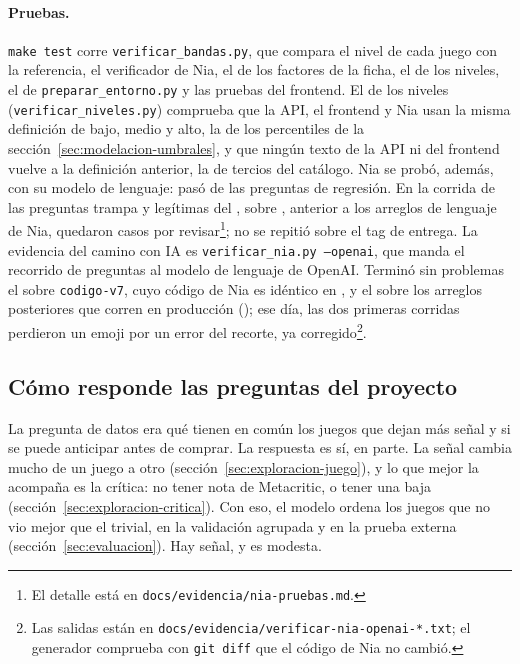 \paragraph{Pruebas.} \texttt{make test} corre \texttt{verificar\_bandas.py}, que compara el nivel de
cada juego con la referencia, el verificador de Nia, el de los factores de la ficha, el de los
niveles, el de \texttt{preparar\_entorno.py} y las pruebas del
frontend. El de los niveles (\texttt{verificar\_niveles.py}) comprueba que la API, el frontend y
Nia usan la misma definición de bajo, medio y alto, la de los percentiles de la
sección~\ref{sec:modelacion-umbrales}, y que ningún texto de la API ni del frontend vuelve a la
definición anterior, la de tercios del catálogo. Nia se probó, además, con su modelo de lenguaje:
pasó \cifraPreguntasNiaAprobadas{} de las \cifraPreguntasNia{} preguntas de regresión. En la corrida
de las \cifraPreguntasTrampa{} preguntas trampa y legítimas del \cifraFechaCorridaTrampas{}, sobre
\texttt{\cifraCommitTrampas}, anterior a los arreglos de lenguaje de Nia, quedaron
\cifraTrampasPorRevisar{} casos por revisar\footnote{El detalle está en
\texttt{docs/evidencia/nia-pruebas.md}.}; no se repitió sobre el tag de entrega. La evidencia del camino con IA
es \texttt{verificar\_nia.py --openai}, que manda el recorrido de preguntas al modelo de lenguaje de
OpenAI. Terminó sin problemas el \cifraFechaCorridaNiaIA{} sobre \mbox{\texttt{codigo-v7}}, cuyo código de
Nia es idéntico en \mbox{\texttt{\cifraTagCodigo}}, y el \cifraFechaCorridaNiaProduccion{} sobre los arreglos
posteriores que corren en producción (\texttt{\cifraCommitNiaProduccion}); ese día, las dos primeras
corridas perdieron un emoji por un error del recorte, ya corregido\footnote{Las salidas están en
\texttt{docs/evidencia/verificar-nia-openai-*.txt}; el generador comprueba con \texttt{git diff} que el
código de Nia no cambió.}.

\subsection{Cómo responde las preguntas del proyecto}\label{sec:resolucion-pregunta}

La pregunta de datos era qué tienen en común los juegos que dejan más señal y si se puede anticipar
antes de comprar. La respuesta es sí, en parte. La señal cambia mucho de un juego a otro
(sección~\ref{sec:exploracion-juego}), y lo que mejor la acompaña es la crítica: no tener nota de
Metacritic, o tener una baja (sección~\ref{sec:exploracion-critica}). Con eso, el modelo ordena los
juegos que no vio mejor que el trivial, en la validación agrupada y en la prueba externa
(sección~\ref{sec:evaluacion}). Hay señal, y es modesta.

